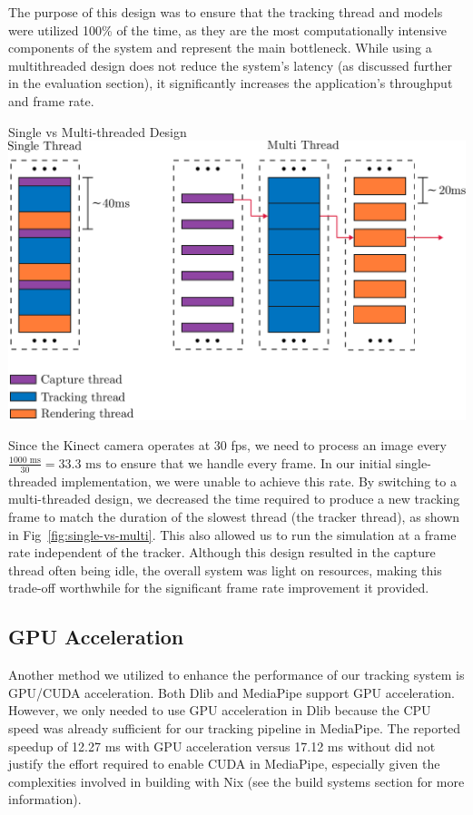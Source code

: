 The purpose of this design was to ensure that the tracking thread and models were utilized 100\% of the time, as they are the most computationally intensive components of the system and represent the main bottleneck. While using a multithreaded design does not reduce the system's latency (as discussed further in the evaluation section), it significantly increases the application's throughput and frame rate.

\begin{figureBox}[label={fig:single-vs-multi}, width=0.75\linewidth]{Single vs Multi-threaded Design}
    \includegraphics[width=0.8\linewidth]{./implementation/figures/single-vs-multi.pdf}
\end{figureBox}

Since the Kinect camera operates at 30 fps, we need to process an image every $ \frac{1000 \text{ ms}}{30} = 33.3 \text{ ms}$ to ensure that we handle every frame. In our initial single-threaded implementation, we were unable to achieve this rate. By switching to a multi-threaded design, we decreased the time required to produce a new tracking frame to match the duration of the slowest thread (the tracker thread), as shown in Fig~\ref{fig:single-vs-multi}. This also allowed us to run the simulation at a frame rate independent of the tracker. Although this design resulted in the capture thread often being idle, the overall system was light on resources, making this trade-off worthwhile for the significant frame rate improvement it provided.


\subsection{GPU Acceleration}

Another method we utilized to enhance the performance of our tracking system is GPU/CUDA acceleration. Both Dlib and MediaPipe support GPU acceleration. However, we only needed to use GPU acceleration in Dlib because the CPU speed was already sufficient for our tracking pipeline in MediaPipe. The reported speedup of 12.27 ms with GPU acceleration versus 17.12 ms without \cite{noauthor_hand_nodate} did not justify the effort required to enable CUDA in MediaPipe, especially given the complexities involved in building with Nix (see the build systems section for more information). \\

